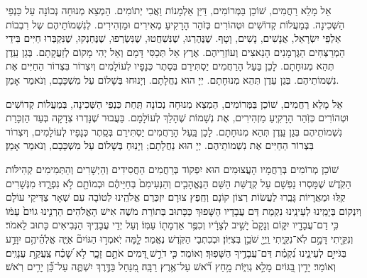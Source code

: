 אֵל מָלֵא רַחֲמִים, שׁוֹכֵן בַּמְּרוֹמִים, דַּיַּן אַלְמָנוֹת וַאֲבִי יְתוֹמִים. הַמְצֵא מְנוּחָה נְכוֹנָה עַל כַּנְפֵי הַשְּׁכִינָה. בְּמַעֲלוֹת קְדוֹשִׁים וּטְהוֹרִים כְּזֹהַר הָרָקִיעַ מְאִירִים וּמַזְהִירִים. לְנִשְׁמוֹתֵיהֶם שֶל רִבְבוֹת אַלְפֵי יִשְׂרָאֵל, אֲנָשִׁים, נָשִׁים, וָטָף. שֶׁנֶּהֶרְגוּ, שֶׁנִּשְׁחֲטוּ, שֶׁנִּשְׂרְפוּ, שֶׁנֶּחְנְקוּ, שֶׁנִּקְבְּרוּ חַיִּים  בִּידֵי הַמְרַצְּחִים הַגֶּרְמָנִים הָנַאצִים וְעוֹזְרֵיהֶם. אֶרֶץ אַל תְּכַסִּי דָּמָם וְאַל יְהִי מָקוֹם לְזַעֲקָתָם. בְּגַן עֵֽדֶן תְּהֵא מְנוּחָתָם. לָכֵן בַּעַל הָרַחֲמִים יַסְתִּירֵם בְּסֵתֶר כְּנָפָיו לְעוֹלָמִים וְיִצְרוֹר בִּצְרוֹר הַחַיִּים אֶת נִשְׁמוֹתֵיהֶם. בְּגַן עֵדֶן תְּהֵא מְנוּחָתָם. יְיָ הוּא נַחֲלָתָם. וְיָנוּחוּ בְּשָׁלוֹם עַל מִשְׁכָּבָם, וְנֹאמַר אָמֵן.


אֵל מָלֵא רַחֲמִים, שׁוֹכֵן בַּמְּרוֹמִים, הַמְצֵא מְנוּחָה נְכוֹנָה תַּֽחַת כַּנְפֵי הַשְּׁכִינָה, בְּמַעֲלוֹת קְדוֹשִׁים וּטְהוֹרִים כְּזֹֽהַר הָרָקִֽיעַ מַזְהִירִים, אֶת נְשָׁמוֹת  שֶׁהָלַךְ לְעוֹלָמָם. בַּעֲבוּר שֶׁנָּדְרוּ צְדָקָה בְּעַד הַזְכָּרַת נִשְׁמוֹתֵיהֶם בְּגַן עֵֽדֶן תְּהֵא מְנוּחָתָם. לָכֵן בַּֽעַל הָרַחֲמִים יַסְתִּירֵם בְּסֵֽתֶר כְּנָפָיו לְעוֹלָמִים, וְיִצְרוֹר בִּצְרוֹר הַחַיִּים אֶת נִשְׁמוֹתֵיהֶם. יְיָ הוּא נַחֲלָתָם; וְיָנֽוּחַ בְּשָׁלוֹם עַל מִשְׁכָּבָם, וְנֹאמַר אָמֵן׃

שׁוֹכֵן מְרוֹמִים בְּרַחֲמָיו הָעֲצוּמִים הוּא יִפְקוֹד בְּרַחֲמִים הַחֲסִידִים וְהַיְשָׁרִים וְהַתְּמִימִים קְהִילּוֹת הַקֹּֽדֶשׁ שֶׁמָּסְרוּ נַפְשָׁם עַל קְדֻשַּׁת הַשֵּׁם הַנֶּאֱהָבִ֤ים וְהַנְּעִימִם֙ בְּחַיֵּיהֶ֔ם וּבְמוֹתָ֖ם לֹ֣א נִפְרָ֑דוּ׃ מִנְּשָׁרִים קַֽלּוּ וּמֵאֲרָיוֹת גָּבֵֽרוּ לַעֲשׂוֹת רְצוֹן קוֹנָם וְחֵֽפֶץ צוּרָם׃ יִזְכְּרֵם אֱלֹהֵֽינוּ לְטוֹבָה עִם שְׁאָר צַדִּיקֵי עוֹלָם וְיִנְקוֹם בְּיָמֵֽינוּ לְעֵינֵֽינוּ נִקְמַת דַּם עֲבָדָיו הַשָּׁפוּךְ כַּכָּתוּב בְּתוֹרַת מֹשֶׁה אִישׁ הָאֱלֹהִים׃ הַרְנִ֤ינוּ גוֹיִם֙ עַמּ֔וֹ כִּ֥י דַם־עֲבָדָ֖יו יִקּ֑וֹם וְנָקָם֙ יָשִׁ֣יב לְצָרָ֔יו וְכִפֶּ֥ר אַדְמָת֖וֹ עַמּֽוֹ׃ וְעַל יְדֵי עֲבָדֶֽיךָ הַנְּבִיאִים כָּתוּב לֵאמֹר׃ וְנִקֵּ֖יתִי דָּמָ֣ם לֹֽא־נִקֵּ֑יתִי וַֽיְיָ֖ שֹׁכֵ֥ן בְּצִיּֽוֹן׃ וּבְכִתְבֵי הַקֹּֽדֶשׁ נֶאֱמַר׃ לָ֤מָּה יֹֽאמְר֣וּ הַגּוֹיִם֘ אַיֵּ֢ה אֱלֹֽהֵ֫יהֶ֥ם יִוָּדַ֣ע בַּגֹּייִ֣ם לְעֵינֵ֑ינוּ נִ֝קְמַ֗ת דַּם־עֲבָדֶ֥יךָ הַשָּׁפֽוּךְ׃ וְאוֹמֵר׃ כִּ֤י דֹרֵ֣שׁ דָּ֭מִים אֹתָ֣ם זָכָ֑ר לֹ֥א שָׁ֝כַ֗ח צַֽעֲקַ֥ת עֲנָוִֽים׃ וְאוֹמֵר׃ יָדִ֣ין בַּ֭גּוֹיִם מָלֵ֣א גְוִיּ֑וֹת מָ֥חַץ רֹ֝֗אשׁ עַל־אֶ֥רֶץ רַבָּֽה׃ מִ֭נַּחַל בַּדֶּ֣רֶךְ יִשְׁתֶּ֑ה עַל־כֵּ֝֗ן יָרִ֥ים רֹֽאשׁ׃

